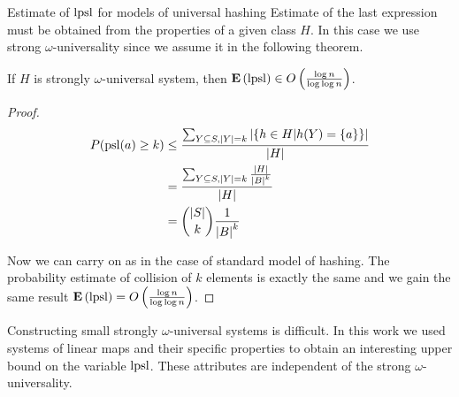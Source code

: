 \begin{section}{Estimate of $\mathrm{lpsl}$ for models of universal hashing}
Estimate of the last expression must be obtained from the properties of a given class $H$. In this case we use strong $\omega$-universality since we assume it in the following theorem.

\begin{theorem}
If $H$ is strongly $\omega$-universal system, then $\mathbf{E}\left(\mathrm{lpsl}\right) \in O\left(\frac{\log n}{\log \log n}\right)$.
\end{theorem}
\begin{proof}
\begin{displaymath}
\begin{split}
P(\mathrm{psl}(a) \geq k) 
	& \leq \frac{\sum\displaylimits_{Y \subseteq S, |Y| = k} | \{ h \in H | h(Y) = \{a\} \}|}{|H|} \\
	& = \frac{\sum\displaylimits_{Y \subseteq S, |Y| = k} \frac{|H|}{{|B|}^{k}}}{|H|} \\
	& = \dbinom{|S|}{k}\frac{1}{{|B|}^k}
\end{split}
\end{displaymath}

Now we can carry on as in the case of standard model of hashing. The probability estimate of collision of $k$ elements is exactly the same and we gain the same result $\mathbf{E}\left(\mathrm{lpsl}\right) = O\left(\frac{\log n}{\log \log n}\right)$.
\end{proof}

Constructing small strongly $\omega$-universal systems is difficult. In this work we used systems of linear maps and their specific properties to obtain an interesting upper bound on the variable $\mathrm{lpsl}$. These attributes are independent of the strong $\omega$-universality.
\end{section}
